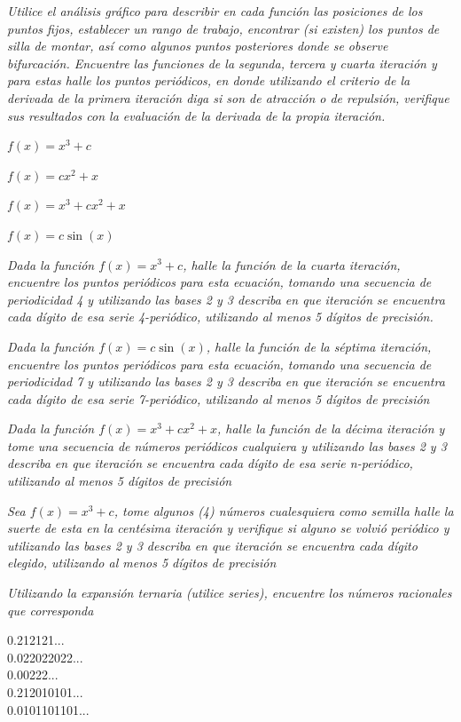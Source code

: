 \documentclass[11pt]{report}
\theoremstyle{plain}
\theoremstyle{definition}
\begin{document}

\textit{Utilice el análisis gráfico para describir en cada función las posiciones de los puntos fijos, establecer un rango de trabajo, encontrar (si existen) los puntos de silla de montar, así como algunos puntos posteriores donde se observe bifurcación. Encuentre las funciones de la segunda, tercera y cuarta iteración y para estas halle los puntos periódicos, en donde utilizando el criterio de la derivada de la primera iteración diga si son de atracción o de repulsión, verifique sus resultados con la evaluación de la derivada de la propia iteración.}

$f(x) = x^3 + c$

$f(x) = cx^2 + x$

$f(x) = x^3 + cx^2 + x$

$f(x) = c\sin(x)$

\textit{Dada la función $f (x) = x^3 + c$, halle la función de la cuarta iteración, encuentre los puntos
periódicos para esta ecuación, tomando una secuencia de periodicidad 4 y utilizando las bases 2 y 3 describa en que iteración se encuentra cada dígito de esa serie 4-periódico, utilizando al menos 5 dígitos de precisión.}

\textit{Dada la función $f (x) = c \sin(x) $, halle la función de la séptima iteración, encuentre los puntos periódicos para esta ecuación, tomando una secuencia de periodicidad 7 y utilizando las bases 2 y 3 describa en que iteración se encuentra cada dígito de esa serie 7-periódico, utilizando al menos 5 dígitos de precisión}

\textit{Dada la función $f(x) = x^3 + cx^2 + x$, halle la función de la décima iteración y tome una secuencia de números periódicos cualquiera y utilizando las bases 2 y 3 describa en que iteración se encuentra cada dígito de esa serie n-periódico, utilizando al menos 5 dígitos de precisión}

\textit{Sea $f (x) = x^3 + c$, tome algunos (4) números cualesquiera como semilla halle la suerte de esta en la centésima iteración y verifique si alguno se volvió periódico y utilizando las bases 2 y 3 describa en que iteración se encuentra cada dígito elegido, utilizando al menos 5 dígitos de precisión}

\textit{Utilizando la expansión ternaria (utilice series), encuentre los números racionales que corresponda}


0.212121...\\
0.022022022...\\
0.00222...\\
0.212010101...\\
0.0101101101...\\
\end{document}
